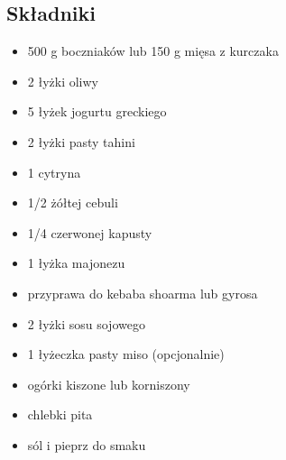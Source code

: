 \documentclass[a4paper,10pt]{book}
\begin{document}
\begin{multicols}{2}

\subsection*{Składniki}
\begin{itemize}
    \item 500 g boczniaków lub 150 g mięsa z kurczaka
    \item 2 łyżki oliwy
    \item 5 łyżek jogurtu greckiego
    \item 2 łyżki pasty tahini
    \item 1 cytryna
    \item 1/2 żółtej cebuli
    \item 1/4 czerwonej kapusty
    \item 1 łyżka majonezu
    \item przyprawa do kebaba shoarma lub gyrosa
    \item 2 łyżki sosu sojowego
    \item 1 łyżeczka pasty miso (opcjonalnie)
    \item ogórki kiszone lub korniszony
    \item chlebki pita 
    \item sól i pieprz do smaku
\end{itemize}

\columnbreak

\begin{figure}[H]
    \centering
\end{figure}
\end{multicols}

\vspace{0.5cm} 
\end{document}
